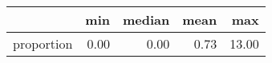 \begin{table}[ht]
\centering
\begin{tabular}{rrrrr}
  \hline
 & min & median & mean & max \\ 
  \hline
proportion & 0.00 & 0.00 & 0.73 & 13.00 \\ 
   \hline
\end{tabular}
\end{table}

